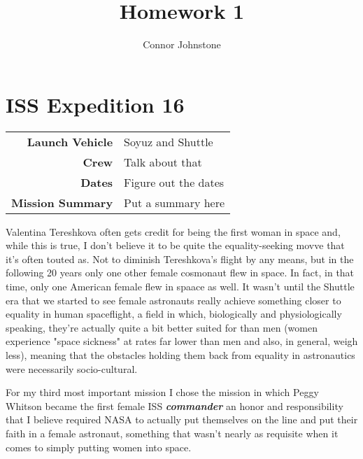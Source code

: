 \documentclass{article}
\begin{document}
  \title{Homework 1}
  \author{Connor Johnstone}

  \maketitle

  \section{ISS Expedition 16}

  \begin{center}
    \begin{tabular}{ >{\bfseries}r | l }
      \hline
      Launch Vehicle & Soyuz and Shuttle \\
      Crew & Talk about that \\
      Dates & Figure out the dates \\
      Mission Summary & Put a summary here \\
      \hline
    \end{tabular}
  \end{center}

  Valentina Tereshkova often gets credit for being the first woman in space and,
  while this is true, I don't believe it to be quite the equality-seeking movve
  that it's often touted as. Not to diminish Tereshkova's flight by any means, but
  in the following 20 years only one other female cosmonaut flew in space.
  In fact, in that time, only one American female flew in
  spaace as well. It wasn't until the Shuttle era that we started to see female
  astronauts really achieve something closer to equality in human spaceflight,
  a field in which, biologically and physiologically speaking, they're actually
  quite a bit better suited for than men (women experience "space sickness" at
  rates far lower than men and also, in general, weigh less), meaning that the
  obstacles holding them back from equality in astronautics were necessarily
  socio-cultural.

  For my third most important mission I chose the mission in which Peggy Whitson
  became the first female ISS \textbf{\textit{commander}} an honor and responsibility that I
  believe required NASA to actually put themselves on the line and put their faith
  in a female astronaut, something that wasn't nearly as requisite when it comes 
  to simply putting women into space.

\end{document}
